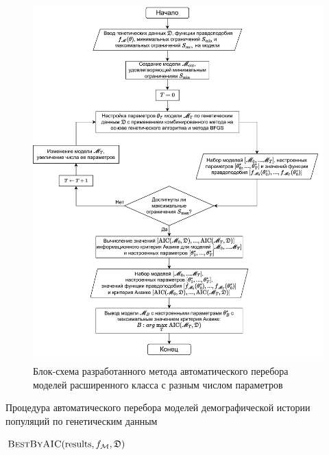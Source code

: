 \begin{figure}[ht!]
    \centering
    \includegraphics[width=\linewidth]{images/part4/auto_model.drawio.pdf}
    \caption{Блок-схема разработанного метода автоматического перебора моделей расширенного класса с разным числом параметров}
    \label{fig:auto:scheme}
\end{figure}

\begin{algorithm}
\caption{Процедура автоматического перебора моделей демографической истории популяций по генетическим данным}
\label{alg:part4:auto_search}
\begin{algorithmic}[1]
\EndWhile
\State \Return $\Call{BestByAIC}{\text{results}, f_\mathcal{M}, \mathfrak{D}}$
\EndFunction
\end{algorithmic}
\end{algorithm}

